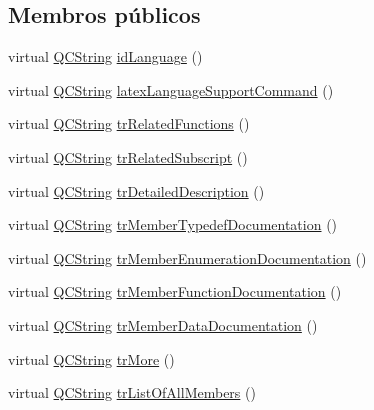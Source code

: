\subsection*{Membros públicos}
\begin{DoxyCompactItemize}
\item 
virtual \hyperlink{class_q_c_string}{Q\-C\-String} \hyperlink{class_translator_chinesetraditional_a903bf0b486fd16dfbc84606e8474ff84}{id\-Language} ()
\item 
virtual \hyperlink{class_q_c_string}{Q\-C\-String} \hyperlink{class_translator_chinesetraditional_a38858830a8a30ed8dd67927882d27ff3}{latex\-Language\-Support\-Command} ()
\item 
virtual \hyperlink{class_q_c_string}{Q\-C\-String} \hyperlink{class_translator_chinesetraditional_a9cdd41a0b3211b9f7f156ddf0176e848}{tr\-Related\-Functions} ()
\item 
virtual \hyperlink{class_q_c_string}{Q\-C\-String} \hyperlink{class_translator_chinesetraditional_a122dc85b3ca735f9344e86cdea420442}{tr\-Related\-Subscript} ()
\item 
virtual \hyperlink{class_q_c_string}{Q\-C\-String} \hyperlink{class_translator_chinesetraditional_a3b56ac2f0285e4ca64e85fe42b3b6510}{tr\-Detailed\-Description} ()
\item 
virtual \hyperlink{class_q_c_string}{Q\-C\-String} \hyperlink{class_translator_chinesetraditional_af1e0f39dbc5f29620b3654646530b7e1}{tr\-Member\-Typedef\-Documentation} ()
\item 
virtual \hyperlink{class_q_c_string}{Q\-C\-String} \hyperlink{class_translator_chinesetraditional_a9ac93f67124761e42466a1d44bff46a7}{tr\-Member\-Enumeration\-Documentation} ()
\item 
virtual \hyperlink{class_q_c_string}{Q\-C\-String} \hyperlink{class_translator_chinesetraditional_aa033beeb0850c3146fcea2aa5252b4ba}{tr\-Member\-Function\-Documentation} ()
\item 
virtual \hyperlink{class_q_c_string}{Q\-C\-String} \hyperlink{class_translator_chinesetraditional_a147916b8e7bfa480c305c89296a30b27}{tr\-Member\-Data\-Documentation} ()
\item 
virtual \hyperlink{class_q_c_string}{Q\-C\-String} \hyperlink{class_translator_chinesetraditional_ad353f5016f330b5494c0722bd412e7da}{tr\-More} ()
\item 
virtual \hyperlink{class_q_c_string}{Q\-C\-String} \hyperlink{class_translator_chinesetraditional_a40c25671c7d3213108dc1b8d2b916a8e}{tr\-List\-Of\-All\-Members} ()
\item 

\end{DoxyCompactItemize}
